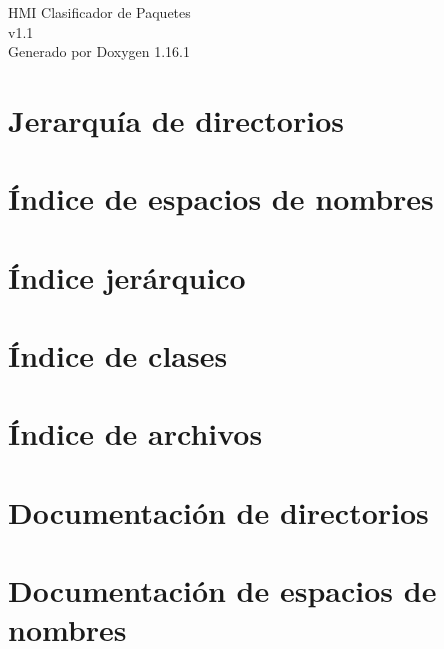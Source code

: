 \documentclass[twoside]{book}
\newcommand{\+}{\discretionary{\mbox{\scriptsize$\hookleftarrow$}}{}{}}
\newcommand{\clearemptydoublepage}{%
    \newpage{\pagestyle{empty}\cleardoublepage}%
  }
\begin{document}
  \raggedbottom
    \hypersetup{pageanchor=false,
                bookmarksnumbered=true,
                pdfencoding=unicode
               }
  \begin{titlepage}
  \vspace*{7cm}
  \begin{center}%
  {\Large HMI Clasificador de Paquetes}\\
  [1ex]\large v1.\+1 \\
  \vspace*{1cm}
  {\large Generado por Doxygen 1.16.1}\\
  \end{center}
  \end{titlepage}
  \clearemptydoublepage
  \tableofcontents
  \clearemptydoublepage
  \hypersetup{pageanchor=true}
\chapter{Jerarquía de directorios}

\chapter{Índice de espacios de nombres}

\chapter{Índice jerárquico}

\chapter{Índice de clases}

\chapter{Índice de archivos}

\chapter{Documentación de directorios}


\chapter{Documentación de espacios de nombres}

\end{document}
